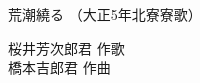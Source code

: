 \documentclass[10pt,b5j]{tarticle} %
\begin{document}
\begin{minipage}[c]{0.7\hsize} %
    \begin{center}
        {\LARGE
            荒潮繞る %
        }
        {\small 
            （大正5年北寮寮歌） %
        }
    \end{center}
\end{minipage}
\begin{minipage}[c]{0.3\hsize} %
    \begin{flushright} %
        桜井芳次郎君 作歌\\橋本吉郎君 作曲 %
    \end{flushright}
\end{minipage}
\end{document}
